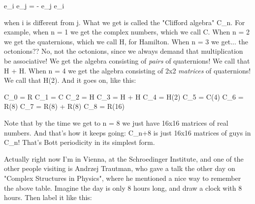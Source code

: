 e_{i} e_{j} = - e_{j} e_{i}

when i is different from j.  What we get is called the "Clifford
algebra" C_{n}.  For example, when n = 1 we get the complex numbers,
which we call C.  When n = 2 we get the quaternions, which we call H,
for Hamilton.  When n = 3 we get... the octonions??  No, not the
octonions, since we always demand that multiplication be associative!
We get the algebra consisting of \emph{pairs} of quaternions!  We call that
H + H.  When n = 4 we get the algebra consisting of 2x2 \emph{matrices} of
quaternions!  We call that H(2).  And it goes on, like this:

C_{0} = R
C_{1} =  C
C_{2} = H
C_{3} = H + H
C_{4} =  H(2)
C_{5} = C(4)
C_{6} = R(8)
C_{7} = R(8) + R(8)
C_{8} = R(16)

Note that by the time we get to n = 8 we just have 16x16 matrices of
real numbers.  And that's how it keeps going: C_{n+8} is just 16x16
matrices of guys in C_{n}!  That's Bott periodicity in its simplest form.

Actually right now I'm in Vienna, at the Schroedinger Institute, and
one of the other people visiting is Andrzej Trautman, who gave a talk
the other day on "Complex Structures in Physics", where he mentioned a
nice way to remember the above table.  Imagine the day is only 8 hours
long, and draw a clock with 8 hours.  Then label it like this:

                        



